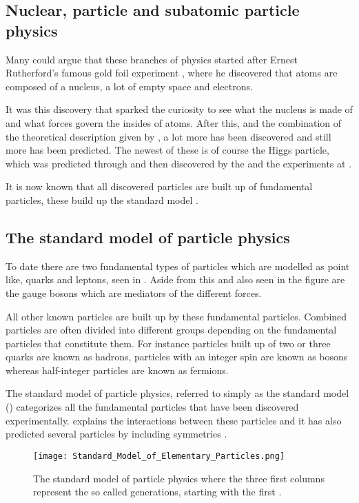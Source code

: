 \subsection{Nuclear, particle and subatomic particle physics}\label{sec:tb:subsec:nps}
Many could argue that these branches of physics started after Ernest Rutherford's famous gold foil experiment \citep{Burchan:1995}, where he discovered that atoms are composed of a nucleus, a lot of empty space and electrons. 

It was this discovery that sparked the curiosity to see what the nucleus is made of and what forces govern the insides of atoms. After this, and the combination of the theoretical description given by \abbrQM, a lot more has been discovered and still more has been predicted. The newest of these is of course the Higgs particle, which was predicted through \abbrQFT and then discovered by the \abbrATLAS and the \abbrCMS experiments at \abbrCERN \citep{Higgs:2012, Chatrchyan:2012}. 

It is now known that all discovered particles are built up of fundamental particles, these build up the standard model \citep{Burchan:1995}.
\subsection{The standard model of particle physics}\label{sec:tb:subsec:SM}
To date there are two fundamental types of particles which are modelled as point like, quarks and leptons, seen in . Aside from this and also seen in the figure are the gauge bosons which are mediators of the different forces.

All other known particles are built up by these fundamental particles. Combined particles are often divided into different groups depending on the fundamental particles that constitute them. For instance particles built up of two or three quarks are known as hadrons, particles with an integer spin are known as bosons whereas half-integer particles are known as fermions.

The standard model of particle physics, referred to simply as the standard model (\abbrSM) categorizes all the fundamental particles that have been discovered experimentally. \abbrQFT explains the interactions between these particles and it has also predicted several particles by including symmetries \citep{Burchan:1995}.
\begin{figure}[h]
 \centering
\texttt{[image: Standard\_Model\_of\_Elementary\_Particles.png]}
  \caption{{\small The standard model of particle physics where the three first columns represent the so called generations, starting with the first \citep{wiki1}.}}
    \label{fig:SM}
\end{figure}

